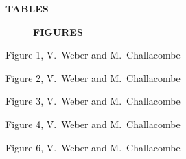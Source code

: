 \documentclass[prl,twocolumn,twocolumngrid,superbib]{revtex4} %
\newcommand{\commentoutB}[1]{#1}
\begin{document}
\commentoutB{


\clearpage

\begin{center}
\bf  TABLES\\[1.cm]
\end{center}

\clearpage

\begin{figure}[h]
\begin{center}
\bf  FIGURES\\[1.cm]
\end{center}


\end{figure}

\clearpage

\begin{center}
Figure 1, V.~Weber and M.~Challacombe \\[1.cm]
\end{center}

\clearpage

\begin{center}
Figure 2, V.~Weber  and M.~Challacombe \\[1.cm]
\end{center}

\clearpage

\begin{center}
Figure 3, V.~Weber  and M.~Challacombe \\[1.cm]
\end{center}

\clearpage

\begin{center}
Figure 4, V.~Weber  and M.~Challacombe \\[1.cm]
\end{center}

\clearpage

\begin{center}
Figure 6, V.~Weber  and M.~Challacombe \\[1.cm]
\end{center}

}
\end{document}
